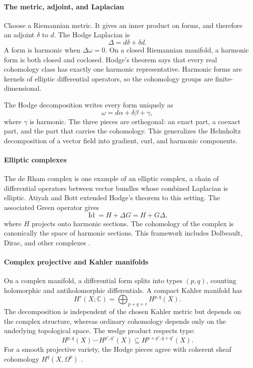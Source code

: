 \paragraph{The metric, adjoint, and Laplacian}
Choose a Riemannian metric. It gives an inner product on forms, and therefore an adjoint $\delta$ to $d$. The Hodge Laplacian is
\[
\Delta=d\delta+\delta d.
\]
A form is harmonic when $\Delta\omega=0$. On a closed Riemannian manifold, a harmonic form is both closed and coclosed. Hodge's theorem says that every real cohomology class has exactly one harmonic representative. Harmonic forms are kernels of elliptic differential operators, so the cohomology groups are finite-dimensional.

The Hodge decomposition writes every form uniquely as
\[
\omega=d\alpha+\delta\beta+\gamma,
\]
where $\gamma$ is harmonic. The three pieces are orthogonal: an exact part, a coexact part, and the part that carries the cohomology. This generalizes the Helmholtz decomposition of a vector field into gradient, curl, and harmonic components.

\paragraph{Elliptic complexes}
The de Rham complex is one example of an elliptic complex, a chain of differential operators between vector bundles whose combined Laplacian is elliptic. Atiyah and Bott extended Hodge's theorem to this setting. The associated Green operator gives
\[
\operatorname{Id}=H+\Delta G=H+G\Delta,
\]
where $H$ projects onto harmonic sections. The cohomology of the complex is canonically the space of harmonic sections. This framework includes Dolbeault, Dirac, and other complexes \cite{hodge_theory_ref2}.

\paragraph{Complex projective and Kahler manifolds}
On a complex manifold, a differential form splits into types $(p,q)$, counting holomorphic and antiholomorphic differentials. A compact Kahler manifold has
\[
H^r(X;\mathbb C)=\bigoplus_{p+q=r}H^{p,q}(X).
\]
The decomposition is independent of the chosen Kahler metric but depends on the complex structure, whereas ordinary cohomology depends only on the underlying topological space. The wedge product respects type:
\[
H^{p,q}(X)\smile H^{p',q'}(X)\subseteq H^{p+p',q+q'}(X).
\]
For a smooth projective variety, the Hodge pieces agree with coherent sheaf cohomology $H^q(X,\Omega^p)$ \cite{hodge_theory_ref4}.

